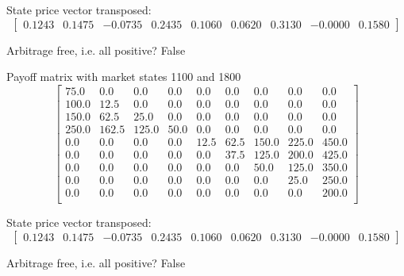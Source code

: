 \documentclass{article}
\begin{document}
State price vector transposed: \[
    \begin{bmatrix} 0.1243 & 0.1475 & -0.0735 & 0.2435 & 0.1060 & 0.0620 & 0.3130 & -0.0000 & 0.1580 \end{bmatrix}
\]

Arbitrage free, i.e. all positive? False

Payoff matrix with market states 1100 and 1800
\[
    \begin{bmatrix}
        75.0  & 0.0   & 0.0   & 0.0  & 0.0  & 0.0  & 0.0   & 0.0   & 0.0   \\
        100.0 & 12.5  & 0.0   & 0.0  & 0.0  & 0.0  & 0.0   & 0.0   & 0.0   \\
        150.0 & 62.5  & 25.0  & 0.0  & 0.0  & 0.0  & 0.0   & 0.0   & 0.0   \\
        250.0 & 162.5 & 125.0 & 50.0 & 0.0  & 0.0  & 0.0   & 0.0   & 0.0   \\
        0.0   & 0.0   & 0.0   & 0.0  & 12.5 & 62.5 & 150.0 & 225.0 & 450.0 \\
        0.0   & 0.0   & 0.0   & 0.0  & 0.0  & 37.5 & 125.0 & 200.0 & 425.0 \\
        0.0   & 0.0   & 0.0   & 0.0  & 0.0  & 0.0  & 50.0  & 125.0 & 350.0 \\
        0.0   & 0.0   & 0.0   & 0.0  & 0.0  & 0.0  & 0.0   & 25.0  & 250.0 \\
        0.0   & 0.0   & 0.0   & 0.0  & 0.0  & 0.0  & 0.0   & 0.0   & 200.0 \\
    \end{bmatrix}
\]

State price vector transposed: \[
    \begin{bmatrix} 0.1243 & 0.1475 & -0.0735 & 0.2435 & 0.1060 & 0.0620 & 0.3130 & -0.0000 & 0.1580 \end{bmatrix}
\]

Arbitrage free, i.e. all positive? False
\end{document}
